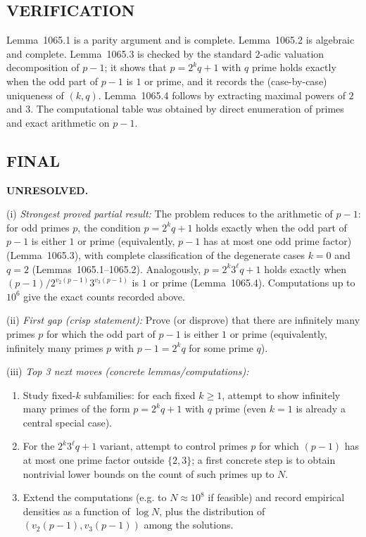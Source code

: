 \subsection*{VERIFICATION}
Lemma~1065.1 is a parity argument and is complete.  Lemma~1065.2 is algebraic and complete.
Lemma~1065.3 is checked by the standard $2$-adic valuation decomposition of $p-1$; it shows that $p=2^kq+1$ with $q$ prime holds exactly when the odd part of $p-1$ is $1$ or prime, and it records the (case-by-case) uniqueness of $(k,q)$.  Lemma~1065.4 follows by extracting maximal powers of $2$ and $3$.
The computational table was obtained by direct enumeration of primes and exact arithmetic on $p-1$.

\subsection*{FINAL}
\textbf{UNRESOLVED.}

(i) \emph{Strongest proved partial result:}
The problem reduces to the arithmetic of $p-1$: for odd primes $p$, the condition $p=2^kq+1$ holds exactly when the odd part of $p-1$ is either $1$ or prime (equivalently, $p-1$ has at most one odd prime factor) (Lemma~1065.3), with complete classification of the degenerate cases $k=0$ and $q=2$ (Lemmas~1065.1--1065.2).  Analogously, $p=2^k3^\ell q+1$ holds exactly when $(p-1)/2^{v_2(p-1)}3^{v_3(p-1)}$ is $1$ or prime (Lemma~1065.4).  Computations up to $10^6$ give the exact counts recorded above.

(ii) \emph{First gap (crisp statement):}
Prove (or disprove) that there are infinitely many primes $p$ for which the odd part of $p-1$ is either $1$ or prime (equivalently, infinitely many primes $p$ with $p-1=2^k q$ for some prime $q$).

(iii) \emph{Top 3 next moves (concrete lemmas/computations):}
\begin{enumerate}
\item Study fixed-$k$ subfamilies: for each fixed $k\ge 1$, attempt to show infinitely many primes of the form $p=2^k q+1$ with $q$ prime (even $k=1$ is already a central special case).
\item For the $2^k3^\ell q+1$ variant, attempt to control primes $p$ for which $(p-1)$ has at most one prime factor outside $\{2,3\}$; a first concrete step is to obtain nontrivial lower bounds on the count of such primes up to $N$.
\item Extend the computations (e.g. to $N\approx 10^8$ if feasible) and record empirical densities as a function of $\log N$, plus the distribution of $(v_2(p-1),v_3(p-1))$ among the solutions.
\end{enumerate}

